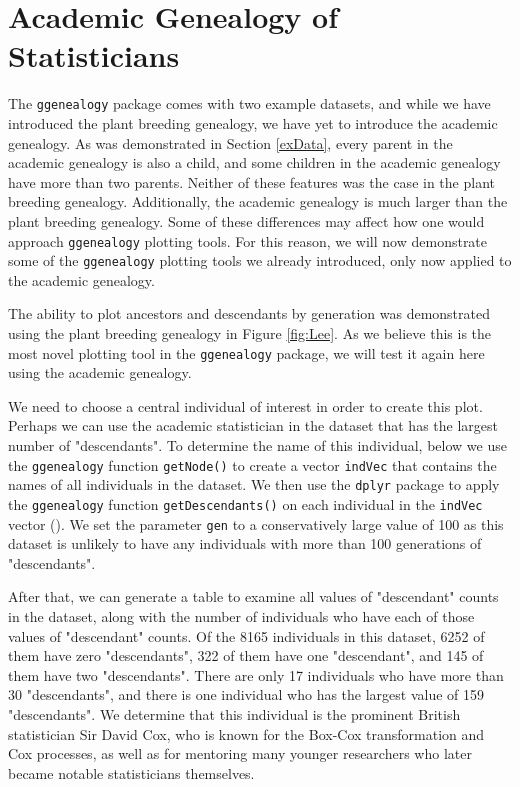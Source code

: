 \documentclass[11pt,a4paper,oldfontcommands,openany]{memoir}
\numberwithin{equation}{section} %
\newcommand{\code}[1]{{\texttt{#1}}}
\newcommand{\pkg}[1]{{\texttt{#1}}}
\begin{document}
\section{Academic Genealogy of Statisticians}

The \pkg{ggenealogy} package comes with two example datasets, and while we have introduced the plant breeding genealogy, we have yet to introduce the academic genealogy. As was demonstrated in Section \ref{exData}, every parent in the academic genealogy is also a child, and some children in the academic genealogy have more than two parents. Neither of these features was the case in the plant breeding genealogy. Additionally, the academic genealogy is much larger than the plant breeding genealogy. Some of these differences may affect how one would approach \pkg{ggenealogy} plotting tools. For this reason, we will now demonstrate some of the \pkg{ggenealogy} plotting tools we already introduced, only now applied to the academic genealogy. 

The ability to plot ancestors and descendants by generation was demonstrated using the plant breeding genealogy in Figure \ref{fig:Lee}. As we believe this is the most novel plotting tool in the \pkg{ggenealogy} package, we will test it again here using the academic genealogy.

We need to choose a central individual of interest in order to create this plot. Perhaps we can use the academic statistician in the dataset that has the largest number of "descendants". To determine the name of this individual, below we use the \pkg{ggenealogy} function \code{getNode()} to create a vector \code{indVec} that contains the names of all individuals in the dataset. We then use the \pkg{dplyr} package to apply the \pkg{ggenealogy} function \code{getDescendants()} on each individual in the \code{indVec} vector (\citealt{dplyr}). We set the parameter \code{gen} to a conservatively large value of 100 as this dataset is unlikely to have any individuals with more than 100 generations of "descendants".

After that, we can generate a table to examine all values of "descendant" counts in the dataset, along with the number of individuals who have each of those values of "descendant" counts. Of the 8165 individuals in this dataset, 6252 of them have zero "descendants", 322 of them have one "descendant", and 145 of them have two "descendants". There are only 17 individuals who have more than 30 "descendants", and there is one individual who has the largest value of 159 "descendants". We determine that this individual is the prominent British statistician Sir David Cox, who is known for the Box-Cox transformation and Cox processes, as well as for mentoring many younger researchers who later became notable statisticians themselves.
\end{document}
